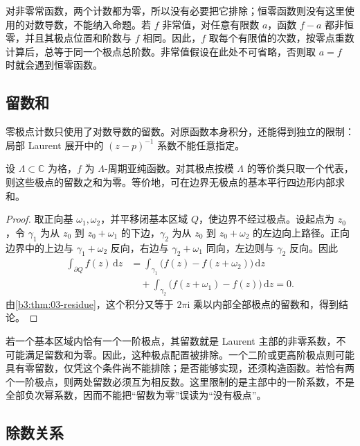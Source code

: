 对非零常函数，两个计数都为零，所以没有必要把它排除；恒零函数则没有这里使用的对数导数，不能纳入命题。若 \(f\) 非常值，对任意有限数 \(a\)，函数 \(f-a\) 都非恒零，并且其极点位置和阶数与 \(f\) 相同。因此，\(f\) 取每个有限值的次数，按零点重数计算后，总等于同一个极点总阶数。非常值假设在此处不可省略，否则取 \(a=f\) 时就会遇到恒零函数。

\subsection{留数和}
\label{b3:subsec:220202}

零极点计数只使用了对数导数的留数。对原函数本身积分，还能得到独立的限制：局部 Laurent 展开中的 \((z-p)^{-1}\) 系数不能任意指定。

\begin{proposition}\label{b3:prop:22-residue-sum}
设 \(\Lambda\subset\mathbb C\) 为格，\(f\) 为 \(\Lambda\)-周期亚纯函数。对其极点按模 \(\Lambda\) 的等价类只取一个代表，则这些极点的留数之和为零。等价地，可在边界无极点的基本平行四边形内部求和。
\end{proposition}
\begin{proof}
取正向基 \(\omega_1,\omega_2\)，并平移闭基本区域 \(Q\)，使边界不经过极点。设起点为 \(z_0\)，令 \(\gamma_1\) 为从 \(z_0\) 到 \(z_0+\omega_1\) 的下边，\(\gamma_2\) 为从 \(z_0\) 到 \(z_0+\omega_2\) 的左边向上路径。正向边界中的上边与 \(\gamma_1+\omega_2\) 反向，右边与 \(\gamma_2+\omega_1\) 同向，左边则与 \(\gamma_2\) 反向。因此
\[
 \begin{aligned}
 \int_{\partial Q}f(z)\,\mathrm{d}z
 &=\int_{\gamma_1}\bigl(f(z)-f(z+\omega_2)\bigr)\,\mathrm{d}z\\
 &\quad+\int_{\gamma_2}\bigl(f(z+\omega_1)-f(z)\bigr)\,\mathrm{d}z
 =0.
 \end{aligned}
\]
由\cref{b3:thm:03-residue}，这个积分又等于 \(2\pi\mathrm{i}\) 乘以内部全部极点的留数和，得到结论。
\end{proof}

若一个基本区域内恰有一个一阶极点，其留数就是 Laurent 主部的非零系数，不可能满足留数和为零。因此，这种极点配置被排除。一个二阶或更高阶极点则可能具有零留数，仅凭这个条件尚不能排除；是否能够实现，还须构造函数。若恰有两个一阶极点，则两处留数必须互为相反数。这里限制的是主部中的一阶系数，不是全部负次幂系数，因而不能把“留数为零”误读为“没有极点”。

\subsection{除数关系}
\label{b3:subsec:220203}

